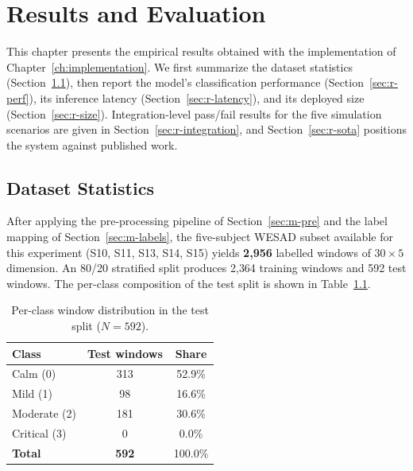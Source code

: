 \chapter{Results and Evaluation}
\label{ch:results}

This chapter presents the empirical results obtained with the
implementation of Chapter~\ref{ch:implementation}. We first summarize
the dataset statistics (Section~\ref{sec:r-data}), then report the
model's classification performance (Section~\ref{sec:r-perf}), its
inference latency (Section~\ref{sec:r-latency}), and its deployed
size (Section~\ref{sec:r-size}). Integration-level pass/fail results
for the five simulation scenarios are given in
Section~\ref{sec:r-integration}, and Section~\ref{sec:r-sota}
positions the system against published work.

\section{Dataset Statistics}
\label{sec:r-data}

After applying the pre-processing pipeline of
Section~\ref{sec:m-pre} and the label mapping of
Section~\ref{sec:m-labels}, the five-subject WESAD subset available
for this experiment (S10, S11, S13, S14, S15) yields \textbf{2{,}956}
labelled windows of $30 \times 5$ dimension. An 80/20 stratified split
produces 2{,}364 training windows and 592 test windows.
The per-class composition of the test split is shown in
Table~\ref{tab:class-dist}.

\begin{table}[H]
\centering
\caption{Per-class window distribution in the test split
($N = 592$).}
\label{tab:class-dist}
\small
\begin{tabular}{lcc}
\toprule
\textbf{Class} & \textbf{Test windows} & \textbf{Share} \\
\midrule
Calm     (0) & 313   & 52.9\% \\
Mild     (1) &  98   & 16.6\% \\
Moderate (2) & 181   & 30.6\% \\
Critical (3) &   0   &  0.0\% \\
\midrule
\textbf{Total} & \textbf{592} & 100.0\% \\
\bottomrule
\end{tabular}
\end{table}


